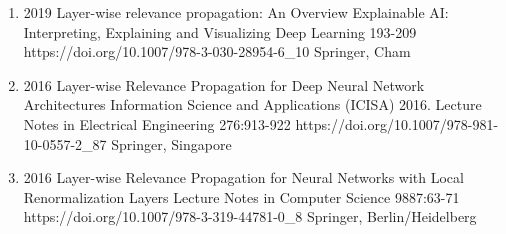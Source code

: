 {\begin{enumerate}
        \item {}
                            {2019}
                            {Layer-wise relevance propagation: An Overview}
                            {Explainable AI: Interpreting, Explaining and Visualizing Deep Learning}
                            {193-209}
                            {https://doi.org/10.1007/978-3-030-28954-6_10}
                            {Springer, Cham}

        \item {}
                            {2016}
                            {Layer-wise Relevance Propagation for Deep Neural Network Architectures}
                            {Information Science and Applications (ICISA) 2016. Lecture Notes in Electrical Engineering}
                            {276:913-922}
                            {https://doi.org/10.1007/978-981-10-0557-2_87}
                            {Springer, Singapore}

        \item {}
                            {2016}
                            {Layer-wise Relevance Propagation for Neural Networks with Local Renormalization Layers}
                            {Lecture Notes in Computer Science}
                            {9887:63-71}
                            {https://doi.org/10.1007/978-3-319-44781-0_8}
                            {Springer, Berlin/Heidelberg}
    \end{enumerate}

}
